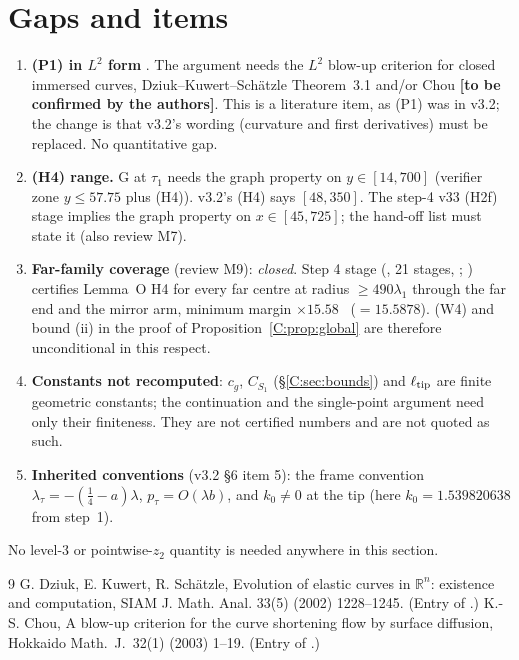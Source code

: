 \documentclass[11pt]{article}
\begin{document}
\section{Gaps and items}\label{C:sec:gaps}
\begin{enumerate}[leftmargin=*]
\item \textbf{(P1) in $L^2$ form} \tH. The argument needs the $L^2$ blow-up criterion for closed immersed curves, Dziuk--Kuwert--Sch\"atzle \cite{DKS2002} Theorem~3.1 and/or Chou \cite{Chou2003} \textbf{[to be confirmed by the authors]}. This is a literature item, as (P1) was in v3.2; the change is that v3.2's wording (curvature and first derivatives) must be replaced. No quantitative gap.
\item \textbf{(H4) range.} G at $\tau_1$ needs the graph property on $y\in[14,700]$ (verifier zone $y\le57.75$ plus (H4)). v3.2's (H4) says $[48,350]$. The step-4 v33 (H2f) stage implies the graph property on $x\in[45,725]$; the hand-off list must state it (also review M7).
\item \textbf{Far-family coverage} (review M9): \emph{closed}. Step 4 stage  (, 21 stages, ; ) certifies Lemma~O H4 for every far centre at radius $\ge490\lambda_1$ through the far end and the mirror arm, minimum margin $\times15.58$ \tC\ ($=15.5878$). (W4) and bound (ii) in the proof of Proposition~\ref{C:prop:global} are therefore unconditional in this respect.
\item \textbf{Constants not recomputed}: $c_g$, $C_{S_1}$ (\S\ref{C:sec:bounds}) and $\ell_{\rm tip}$ are finite geometric constants; the continuation and the single-point argument need only their finiteness. They are not certified numbers and are not quoted as such.
\item \textbf{Inherited conventions} (v3.2 \S6 item 5): the frame convention $\lambda_\tau=-(\frac14-a)\lambda$, $p_\tau=O(\lambda b)$, and $k_0\ne0$ at the tip (here $k_0=1.539820638$ from step~1).
\end{enumerate}
No level-3 or pointwise-$z_2$ quantity is needed anywhere in this section.

\ifdefined\stepmain\else
\begin{thebibliography}{9}
 G. Dziuk, E. Kuwert, R. Sch\"atzle, Evolution of elastic curves in $\mathbb R^n$: existence and computation, SIAM J. Math. Anal. 33(5) (2002) 1228--1245. (Entry  of .)
 K.-S. Chou, A blow-up criterion for the curve shortening flow by surface diffusion, Hokkaido Math.\ J.\ 32(1) (2003) 1--19. (Entry  of .)
\end{thebibliography}
\end{document}
